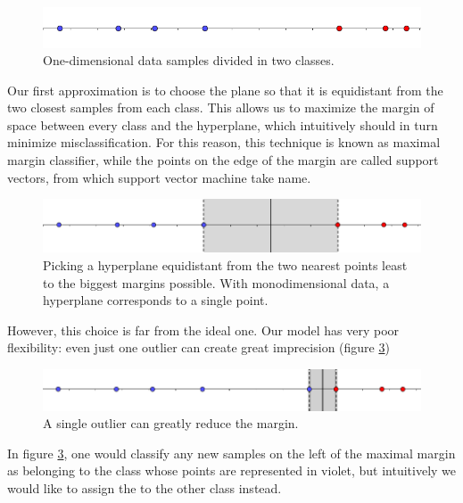\documentclass[a4paper]{report}
\begin{document}
\begin{figure} [H]
	\centering
	\includegraphics [width=\textwidth ]{svm/1dim.png}
	\caption{One-dimensional data samples divided in two classes.}
	\label{1dim}
\end{figure}


Our first approximation is to choose the plane so that it is equidistant from the two closest samples from each class.
This allows us to maximize the margin of space between every class and the hyperplane, which intuitively should in turn minimize misclassification.
For this reason, this technique is known as maximal margin classifier, while the points on the edge of the margin are called support vectors, from which support vector machine take name.

\begin{figure} [H]
	\centering
	\includegraphics [width=\textwidth ]{svm/1dim_disq.png}
	\caption{Picking a hyperplane equidistant from the two nearest points least to the biggest margins possible. With monodimensional data, a hyperplane corresponds to a single point.}
	\label{1dim1_disq}
\end{figure}

However, this choice is far from the ideal one.
Our model has very poor flexibility:
even just one outlier can create great imprecision (figure \ref{1dim_disq2})


\begin{figure} [H]
	\centering
	\includegraphics [width=\textwidth ]{svm/1dim_disq2.png}
	\caption{A single outlier can greatly reduce the margin.}
	\label{1dim_disq2}
\end{figure}

In figure \ref{1dim_disq2}, one would classify any new samples on the left of the maximal margin as belonging to the class whose points are represented in violet, but intuitively we would like to assign the to the other class instead.
\end{document}
